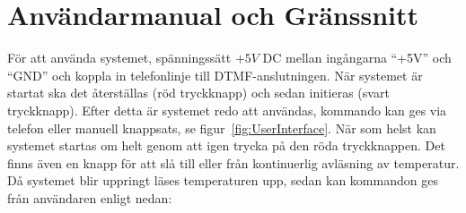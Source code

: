 \documentclass[a4paper,11pt]{article}
\begin{document}
\pagebreak

	\appendix
	\renewcommand{\appendixpagename}{Appendix}
	\appendixpage
	\renewcommand{\appendixtocname}{Appendix}

	\addappheadtotoc

	\section{Användarmanual och Gränssnitt}
	\label{sec:Manual}
	För att använda systemet, spänningssätt $+5V$ DC mellan ingångarna ``+5V'' och ``GND'' och koppla in telefonlinje till DTMF-anslutningen.
	När systemet är startat ska det återställas (röd tryckknapp) och sedan initieras (svart tryckknapp).
	Efter detta är systemet redo att användas, kommando kan ges via telefon eller manuell knappsats, se figur~\ref{fig:UserInterface}.
	När som helst kan systemet startas om helt genom att igen trycka på den röda tryckknappen. Det finns även en knapp för
	att slå till eller från kontinuerlig avläsning av temperatur.
	Då systemet blir uppringt läses temperaturen upp, sedan kan kommandon ges från användaren enligt nedan:\\
\end{document}
